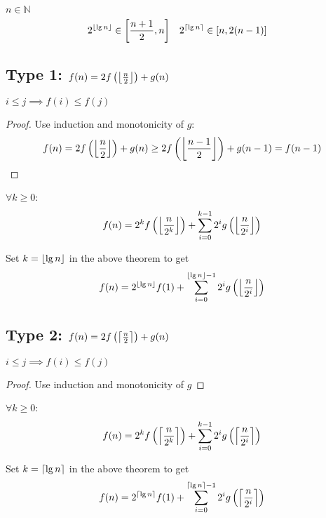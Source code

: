 \begin{lemma} $n \in \mathbb{N}$
\begin{align*}
2^{\left\lfloor \lg n \right\rfloor} &\in \left[ \frac{n+1}{2}, n \right] & 2^{\left\lceil \lg n \right\rceil} &\in \left[ n, 2(n-1) \right]
\end{align*}
\end{lemma}

\subsection[Type 1]{Type 1: $f(n) = 2f\left(\left\lfloor \frac{n}{2} \right\rfloor\right) + g(n)$}

\begin{theorem}[Monotonicity] $i \le j \implies f(i) \le f(j)$ \end{theorem}
\begin{proof} Use induction and monotonicity of $g$:
\[ f(n)
= 2f\left(\left\lfloor \frac{n}{2} \right\rfloor\right) + g(n)
\ge 2f\left(\left\lfloor \frac{n-1}{2} \right\rfloor\right) + g(n-1)
= f(n-1) \]
\end{proof}

\begin{theorem} $\forall k \ge 0$:
\[ f(n) = 2^k f\left(\left\lfloor \frac{n}{2^k} \right\rfloor\right)
    + \sum_{i=0}^{k-1} 2^i g\left(\left\lfloor \frac{n}{2^i} \right\rfloor\right) \]
\end{theorem}

Set $k = \left\lfloor \lg n \right\rfloor$ in the above theorem to get
\[ f(n) = 2^{\left\lfloor \lg n \right\rfloor}f(1) + \sum_{i=0}^{\left\lfloor \lg n \right\rfloor-1} 2^i g\left( \left\lfloor \frac{n}{2^i} \right\rfloor \right) \]

\subsection[Type 2]{Type 2: $f(n) = 2f\left(\left\lceil \frac{n}{2} \right\rceil\right) + g(n)$}

\begin{theorem}[Monotonicity] $i \le j \implies f(i) \le f(j)$ \end{theorem}
\begin{proof} Use induction and monotonicity of $g$ \end{proof}

\begin{theorem} $\forall k \ge 0$:
\[ f(n) = 2^k f\left(\left\lceil \frac{n}{2^k} \right\rceil\right)
    + \sum_{i=0}^{k-1} 2^i g\left(\left\lceil \frac{n}{2^i} \right\rceil\right) \]
\end{theorem}


Set $k = \left\lceil \lg n \right\rceil$ in the above theorem to get
\[ f(n) = 2^{\left\lceil \lg n \right\rceil}f(1) + \sum_{i=0}^{\left\lceil \lg n \right\rceil-1} 2^i g\left( \left\lceil \frac{n}{2^i} \right\rceil \right) \]

